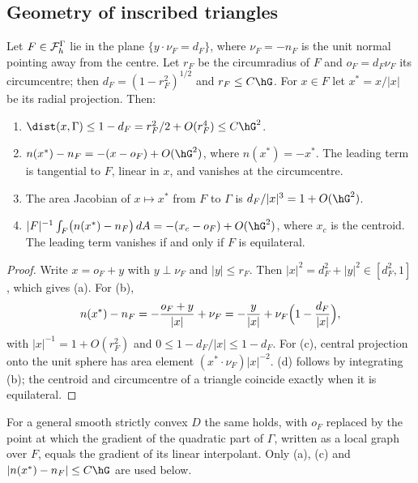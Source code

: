 \subsection{Geometry of inscribed triangles}

\begin{lemma}[Faces]\label{td:faces}
Let $F\in\mathcal F_h^\Gamma$ lie in the plane $\{y\cdot\nu_F=d_F\}$, where $\nu_F=-n_F$ is the unit normal pointing away from the centre. Let $r_F$ be the circumradius of $F$ and $o_F=d_F\nu_F$ its circumcentre; then $d_F=(1-r_F^2)^{1/2}$ and $r_F\le C\hG$. For $x\in F$ let $x^\ast=x/|x|$ be its radial projection. Then:
\begin{enumerate}[label=(\alph*)]
\item $\dist(x,\Gamma)\le1-d_F=r_F^2/2+O(r_F^4)\le C\hG^2$.
\item $n(x^\ast)-n_F=-(x-o_F)+O(\hG^2)$, where $n(x^\ast)=-x^\ast$. The leading term is tangential to $F$, linear in $x$, and vanishes at the circumcentre.
\item The area Jacobian of $x\mapsto x^\ast$ from $F$ to $\Gamma$ is $d_F/|x|^3=1+O(\hG^2)$.
\item $|F|^{-1}\int_F\bigl(n(x^\ast)-n_F\bigr)\,dA=-(x_c-o_F)+O(\hG^2)$, where $x_c$ is the centroid. The leading term vanishes if and only if $F$ is equilateral.
\end{enumerate}
\end{lemma}

\begin{proof}
Write $x=o_F+y$ with $y\perp\nu_F$ and $|y|\le r_F$. Then $|x|^2=d_F^2+|y|^2\in[d_F^2,1]$, which gives (a). For (b),
\[
n(x^\ast)-n_F=-\frac{o_F+y}{|x|}+\nu_F=-\frac{y}{|x|}+\nu_F\Bigl(1-\frac{d_F}{|x|}\Bigr),
\]
with $|x|^{-1}=1+O(r_F^2)$ and $0\le1-d_F/|x|\le1-d_F$. For (c), central projection onto the unit sphere has area element $(x^\ast\cdot\nu_F)|x|^{-2}$. (d) follows by integrating (b); the centroid and circumcentre of a triangle coincide exactly when it is equilateral.
\end{proof}

For a general smooth strictly convex $D$ the same holds, with $o_F$ replaced by the point at which the gradient of the quadratic part of $\Gamma$, written as a local graph over $F$, equals the gradient of its linear interpolant. Only (a), (c) and $|n(x^\ast)-n_F|\le C\hG$ are used below.

